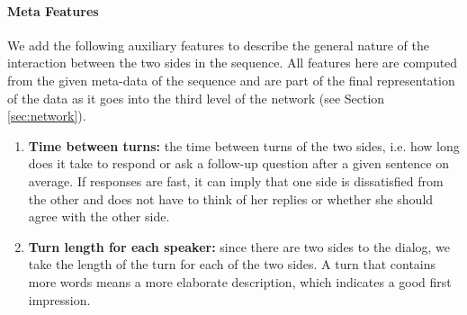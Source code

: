 


\paragraph*{Meta Features}
We add the following auxiliary features 
to describe the general nature 
of the interaction between the two sides 
in the sequence. All features here 
are computed from the given meta-data of the sequence and 
are part of the final representation of the data as it goes into the 
third level of the network (see Section \ref{sec:network}). 

\begin{enumerate}
\item {\bf Time between turns: } the time between 
turns of the two sides, i.e. how long does it take to respond or ask a follow-up 
question after a given sentence on average. 
If responses are fast, it can imply that one side is dissatisfied 
from the other and does not have to think of her replies or whether 
she should agree with the other side.\label{itm:between}


\item {\bf Turn length for each speaker: } since there are two sides to the dialog, 
we take the length of the turn for each of the two sides. 
A turn that contains more words means a more elaborate description, which indicates 
a good first impression.\label{itm:sent}



\end{enumerate} 

